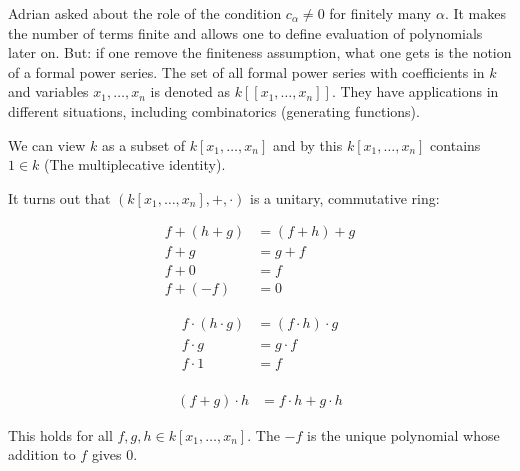 \begin{remark}[title=Adrian's Question]
Adrian asked about the role of the condition $c_\alpha \ne 0$ for finitely many $\alpha$. It makes the number of terms finite and allows one to define evaluation of polynomials later on. But: if one remove the 
finiteness assumption, what one gets is the notion of a formal power series. The set of all formal power series with coefficients in $k$ and variables $x_1,\ldots,x_n$ is denoted as $k[[x_1,\ldots,x_n]]$. They 
have applications in different situations, including combinatorics (generating functions). 
\end{remark} 

\begin{remark}[title = Remark 1.1.3] 
    We can view $k$ as a subset of $k[x_1, \dots, x_n]$ and by this $k[x_1, \dots, x_n]$ contains $1\in k$ (The multiplecative identity). 

    It turns out that $(k[x_1, \dots, x_n], +, \cdot)$ is a unitary, commutative ring:   

    \begin{minipage}[t]{0.33\textwidth}
      \begin{align*}
          f+(h+g) &= (f+h)+g \\
          f+g &= g+f \\
          f + 0 & = f\\ 
          f + (-f) & = 0  
      \end{align*}
    \end{minipage}
    \begin{minipage}[t]{0.33\textwidth}
      \begin{align*}
          f \cdot (h \cdot g) &= (f \cdot h) \cdot g \\
          f \cdot g &= g \cdot f \\
          f \cdot 1 & = f\\ 
      \end{align*} 
    \end{minipage}
    \begin{minipage}[t]{0.33\textwidth}
      \begin{align*}
          (f + g) \cdot h & = f \cdot h + g \cdot h
      \end{align*}
    \end{minipage}

    This holds for all $f, g, h \in k[x_1, \dots, x_n]$. The $-f$ is the unique polynomial whose addition to $f$ gives 0.
\end{remark}

